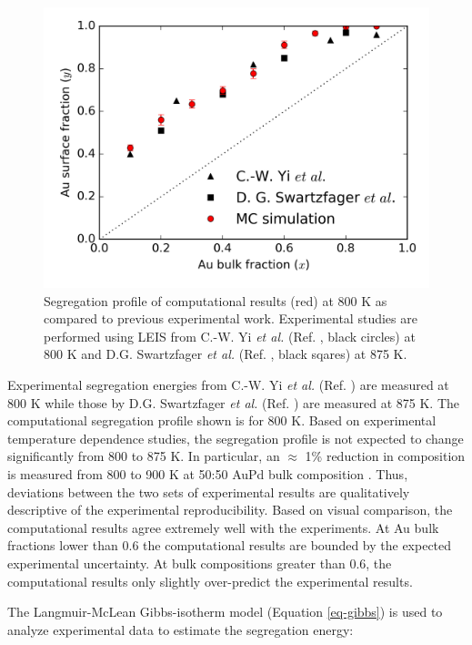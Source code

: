\documentclass[12pt,oneside]{cmuthesis}
\begin{document}
\begin{figure}[h]
\centering
\includegraphics[width=5.5in]{./images/AuPd-segregation.png}
\caption{\label{fig-AuPd-segregation}
Segregation profile of computational results (red) at 800 K as compared to previous experimental work. Experimental studies are performed using LEIS from C.-W. Yi \emph{et al.} (Ref. , black circles) at 800 K and D.G. Swartzfager \emph{et al.} (Ref. , black sqares) at 875 K.}
\end{figure}

Experimental segregation energies from C.-W. Yi \emph{et al.} (Ref. ) are measured at 800 K while those by D.G. Swartzfager \emph{et al.} (Ref. ) are measured at 875 K. The computational segregation profile shown is for 800 K. Based on experimental temperature dependence studies, the segregation profile is not expected to change significantly from 800 to 875 K. In particular, an \(\approx\) 1\% reduction in composition is measured from 800 to 900 K at 50:50 AuPd bulk composition \cite{yi-2005-compos-struc}. Thus, deviations between the two sets of experimental results are qualitatively descriptive of the experimental reproducibility. Based on visual comparison, the computational results agree extremely well with the experiments. At Au bulk fractions lower than 0.6 the computational results are bounded by the expected experimental uncertainty. At bulk compositions greater than 0.6, the computational results only slightly over-predict the experimental results.

The Langmuir-McLean Gibbs-isotherm model (Equation \ref{eq-gibbs}) is used to analyze experimental data to estimate the segregation energy:
\end{document}
